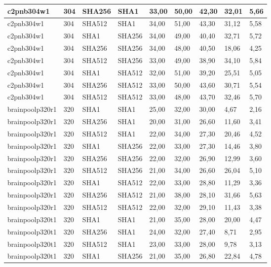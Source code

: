 \begin{longtable}{| l | l | l | l | l |l |l |l |l |}
c2pnb304w1 & 304 & SHA256 & SHA1 & 33,00 & 50,00 & 42,30 & 32,01 & 5,66 \\ \hline 
c2pnb304w1 & 304 & SHA512 & SHA1 & 34,00 & 51,00 & 43,30 & 31,12 & 5,58 \\ \hline 
c2pnb304w1 & 304 & SHA1 & SHA256 & 34,00 & 49,00 & 40,40 & 32,71 & 5,72 \\ \hline 
c2pnb304w1 & 304 & SHA256 & SHA256 & 34,00 & 48,00 & 40,50 & 18,06 & 4,25 \\ \hline 
c2pnb304w1 & 304 & SHA512 & SHA256 & 33,00 & 49,00 & 38,90 & 34,10 & 5,84 \\ \hline 
c2pnb304w1 & 304 & SHA1 & SHA512 & 32,00 & 51,00 & 39,20 & 25,51 & 5,05 \\ \hline 
c2pnb304w1 & 304 & SHA256 & SHA512 & 33,00 & 50,00 & 43,60 & 30,71 & 5,54 \\ \hline 
c2pnb304w1 & 304 & SHA512 & SHA512 & 33,00 & 48,00 & 43,70 & 32,46 & 5,70 \\ \hline 
brainpoolp320r1 & 320 & SHA1 & SHA1 & 25,00 & 32,00 & 30,00 & 4,67 & 2,16 \\ \hline 
brainpoolp320r1 & 320 & SHA256 & SHA1 & 20,00 & 31,00 & 26,60 & 11,60 & 3,41 \\ \hline 
brainpoolp320r1 & 320 & SHA512 & SHA1 & 22,00 & 34,00 & 27,30 & 20,46 & 4,52 \\ \hline 
brainpoolp320r1 & 320 & SHA1 & SHA256 & 22,00 & 33,00 & 27,30 & 14,46 & 3,80 \\ \hline 
brainpoolp320r1 & 320 & SHA256 & SHA256 & 22,00 & 32,00 & 26,90 & 12,99 & 3,60 \\ \hline 
brainpoolp320r1 & 320 & SHA512 & SHA256 & 21,00 & 34,00 & 26,60 & 26,04 & 5,10 \\ \hline 
brainpoolp320r1 & 320 & SHA1 & SHA512 & 22,00 & 33,00 & 28,80 & 11,29 & 3,36 \\ \hline 
brainpoolp320r1 & 320 & SHA256 & SHA512 & 21,00 & 38,00 & 28,10 & 31,66 & 5,63 \\ \hline 
brainpoolp320r1 & 320 & SHA512 & SHA512 & 22,00 & 32,00 & 29,10 & 11,43 & 3,38 \\ \hline 
brainpoolp320t1 & 320 & SHA1 & SHA1 & 21,00 & 35,00 & 28,00 & 20,00 & 4,47 \\ \hline 
brainpoolp320t1 & 320 & SHA256 & SHA1 & 24,00 & 32,00 & 27,40 & 8,71 & 2,95 \\ \hline 
brainpoolp320t1 & 320 & SHA512 & SHA1 & 23,00 & 33,00 & 28,00 & 9,78 & 3,13 \\ \hline 
brainpoolp320t1 & 320 & SHA1 & SHA256 & 21,00 & 35,00 & 26,80 & 22,84 & 4,78 \\ \hline 

\end{longtable}
